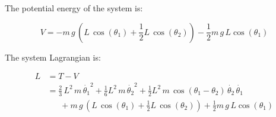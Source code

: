 \documentclass[12pt, letterpaper]{../assignment}
\begin{document}
The potential energy of the system is:

$$ V = -m\,g\,{\left(L\,\cos \left(\theta_1 \right)+\frac{1}{2}L\,\cos \left(\theta_2 \right)\right)}-\frac{1}{2}m\,g\,L\cos \left(\theta_1 \right) $$

The system Lagrangian is:

\begin{equation*}
    \begin{aligned}
L &= T - V\\
 &= \frac{2}{3}\,L^2 \,m\,{{\dot{\theta_1}}}^2+
\frac{1}{6}L^2 \,m\,{{\dot{\theta_2}}}^2+
\frac{1}{2}L^2 \,m\,\cos \left(\theta_1 -\theta_2 \right)\,\dot{\theta_2} \,\dot{\theta_1} \\
& \ \ \ \ \ \ \ + m\,g\,{\left(L\,\cos \left(\theta_1 \right)+\frac{1}{2}L\,\cos \left(\theta_2 \right)\right)}+\frac{1}{2}m\,g\,L\cos \left(\theta_1 \right)
\end{aligned}
\end{equation*}

\end{document}
